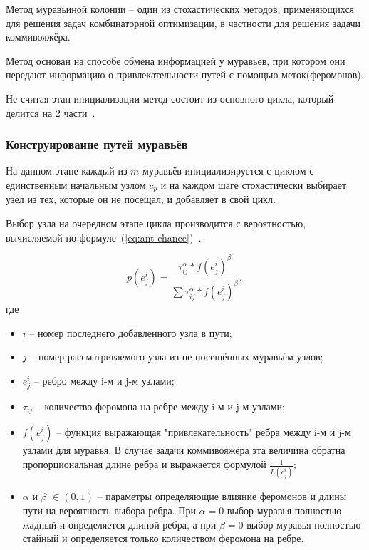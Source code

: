 Метод муравьиной колонии -- один из стохастических методов, применяющихся для решения задач комбинаторной оптимизации, в частности для решения задачи коммивояжёра.

Метод основан на способе обмена информацией у муравьев, при котором они передают информацию о привлекательности путей с помощью меток(феромонов).

Не считая этап инициализации метод состоит из основного цикла, который делится на 2 части~\cite{heurestics}.

\subsubsection{Конструирование путей муравьёв}

На данном этапе каждый из $m$ муравьёв инициализируется с циклом с единственным начальным узлом $c_p$ и на каждом шаге стохастически выбирает узел из тех, которые он не посещал, и добавляет в свой цикл.

Выбор узла на очередном этапе цикла производится с вероятностью, вычисляемой по формуле~(\ref{eq:ant-chance})~\cite{heurestics}.

\begin{equation}
	\label{eq:ant-chance}
	p(e^i_j) = \frac{\tau^\alpha_{ij}*f(e^i_j)^\beta}{\sum{\tau^\alpha_{ij}*f(e^i_j)^\beta}},
\end{equation}
где 
\begin{itemize}
	\item $i$ -- номер последнего добавленного узла в пути;
	\item $j$ -- номер рассматриваемого узла из не посещённых муравьём узлов;
	\item $e^i_j$ -- ребро между i-м и j-м узлами;
	\item $\tau_{ij}$ -- количество феромона на ребре между i-м и j-м узлами;
	\item $f(e^i_j)$ -- функция выражающая "привлекательность" ребра между i-м и j-м узлами для муравья. В случае задачи коммивояжёра эта величина обратна пропорциональная длине ребра и выражается формулой $\frac{1}{L(e^i_j)}$;
	\item $\alpha$ и $\beta$ $\in (0, 1)$ -- параметры определяющие влияние феромонов и длины пути на вероятность выбора ребра. При $\alpha = 0$ выбор муравья полностью жадный и определяется длиной ребра, а при $\beta = 0$ выбор муравья полностью стайный и определяется только количеством феромона на ребре.
\end{itemize}

